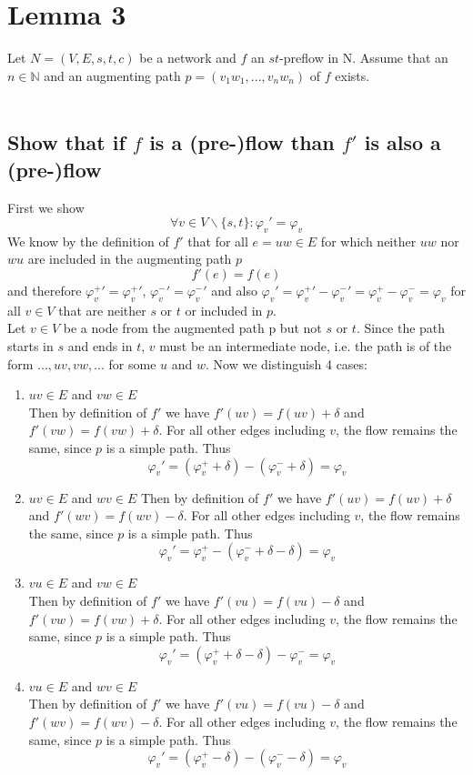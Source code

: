 \documentclass[10pt,a4paper]{article}
\begin{document}
	\section{Lemma 3}
	Let $N = (V, E, s, t, c)$ be a network  and $f$ an $st$-preflow in N.  Assume that an $n \in \mathbb{N}$  and an  augmenting path $p = (v_1w_1, ... ,v_nw_n)$ of $f$ exists. \\\\
	
	\subsection*{Show that if $f$ is a (pre-)flow than $f'$ is also a (pre-)flow}
	First we show
	\begin{equation}
	\label{eq:flux_same}
	\forall v \in V\backslash\{s,t\}: \varphi_v' = \varphi_v
	\end{equation}
	We know by the definition of $f'$ that for all $e = uw\in E$ for which neither $uw$ nor $wu$ are included in the augmenting path $p$
	$$f'(e) = f(e)$$
	and therefore $\varphi_v^{+} ' = \varphi_v^+ '$, $\varphi_v^- ' = \varphi_v^- '$ and also $\varphi_v' = \varphi_v^+' - \varphi_v^-' = \varphi_v^+ - \varphi_v^- = \varphi_v$ for all $v \in V$ that are neither $s$ or $t$ or included in $p$. \\
	Let $v \in V$ be a node from the augmented path p but not $s$ or $t$. Since the path starts in $s$ and ends in $t$, $v$ must be an intermediate node, i.e. the path is of the form $..., uv, vw,...$ for some $u$ and $w$.  Now we distinguish 4 cases:
	\begin{enumerate}
		\item $uv \in E$ and $vw \in E$ \\
		Then by definition of $f'$ we have $f'(uv) = f(uv) + \delta$ and $f'(vw) = f(vw) + \delta$. For all other edges including $v$, the flow remains the same, since $p$ is a simple path. Thus 
		$$\varphi_v' = (\varphi_v^+ + \delta) - (\varphi_v^- + \delta) = \varphi_v$$
		
		\item $uv \in E$ and $wv \in E$
		Then by definition of $f'$ we have $f'(uv) = f(uv) + \delta$ and $f'(wv) = f(wv) - \delta$. For all other edges including $v$, the flow remains the same, since $p$ is a simple path. Thus 
		$$\varphi_v' = \varphi_v^+ - (\varphi_v^- + \delta - \delta)= \varphi_v$$

		\item $vu \in E$ and $vw \in E$ \\
		Then by definition of $f'$ we have $f'(vu) = f(vu) - \delta$ and $f'(vw) = f(vw) + \delta$. For all other edges including $v$, the flow remains the same, since $p$ is a simple path. Thus 
		$$\varphi_v' = (\varphi_v^+ + \delta - \delta) - \varphi_v^- = \varphi_v$$
		
		\item $vu \in E$ and $wv \in E$ \\
		Then by definition of $f'$ we have $f'(vu) = f(vu) - \delta$ and $f'(wv) = f(wv) - \delta$. For all other edges including $v$, the flow remains the same, since $p$ is a simple path. Thus 
		$$\varphi_v' = (\varphi_v^+ - \delta) - (\varphi_v^- - \delta) = \varphi_v$$
	\end{enumerate}
\end{document}
